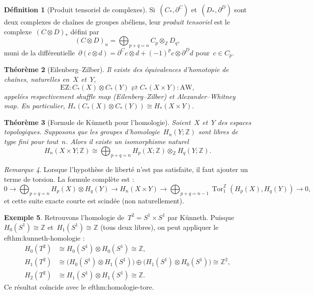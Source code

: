 \documentclass[12pt,a4paper,openany]{book}
\theoremstyle{definition}
\newtheorem{definition}{Définition}[chapter]
\newtheorem{exemple}[definition]{Exemple}
\theoremstyle{plain}
\newtheorem{theoreme}[definition]{Théorème}
\theoremstyle{remark}
\newtheorem{remarque}[definition]{Remarque}
\newcommand{\Z}{\mathbb{Z}}
\begin{document}
\begin{definition}[Produit tensoriel de complexes]\label{def:produit-tensoriel-complexes}
Si~$(C_*, \partial^C)$ et~$(D_*, \partial^D)$ sont deux complexes de chaînes de groupes
abéliens, leur \emph{produit tensoriel} est le complexe~$(C \otimes D)_*$ défini par
\[
  (C \otimes D)_n = \bigoplus_{p+q=n} C_p \otimes_\Z D_q,
\]
muni de la différentielle~$\partial(c \otimes d) = \partial^C c \otimes d + (-1)^p c \otimes \partial^D d$
pour~$c \in C_p$.
\end{definition}

\begin{theoreme}[Eilenberg--Zilber]\label{thm:eilenberg-zilber}
Il existe des équivalences d'homotopie de chaînes, naturelles en~$X$ et~$Y$,
\[
  \mathrm{EZ} \colon C_*(X) \otimes C_*(Y) \rightleftarrows C_*(X \times Y) :\! \mathrm{AW},
\]
appelées respectivement \emph{shuffle map} (Eilenberg--Zilber) et
\emph{Alexander--Whitney map}. En particulier,
$H_*(C_*(X) \otimes C_*(Y)) \cong H_*(X \times Y)$.
\end{theoreme}

\begin{theoreme}[Formule de Künneth pour l'homologie]\label{thm:kunneth-homologie}
Soient~$X$ et~$Y$ des espaces topologiques. Supposons que les groupes
d'homologie~$H_n(Y;\Z)$ sont libres de type fini pour tout~$n$. Alors il existe un
isomorphisme naturel
\[
  H_n(X \times Y;\Z) \cong
  \bigoplus_{p+q=n} H_p(X;\Z) \otimes_\Z H_q(Y;\Z).
\]
\end{theoreme}

\begin{remarque}\label{rem:kunneth-torsion}
Lorsque l'hypothèse de liberté n'est pas satisfaite, il faut ajouter un terme de
torsion. La formule complète est :
\[
  0 \to \bigoplus_{p+q=n} H_p(X) \otimes H_q(Y)
  \to H_n(X \times Y)
  \to \bigoplus_{p+q=n-1} \operatorname{Tor}_1^\Z(H_p(X), H_q(Y))
  \to 0,
\]
et cette suite exacte courte est scindée (non naturellement).
\end{remarque}

\begin{exemple}\label{ex:kunneth-tore}
Retrouvons l'homologie de~$T^2 = S^1 \times S^1$ par Künneth. Puisque~$H_0(S^1) \cong \Z$
et~$H_1(S^1) \cong \Z$ (tous deux libres), on peut appliquer le 
ef{thm:kunneth-homologie} :
\begin{align*}
  H_0(T^2) &\cong H_0(S^1) \otimes H_0(S^1) \cong \Z,\\
  H_1(T^2) &\cong \bigl(H_0(S^1) \otimes H_1(S^1)\bigr)
    \oplus \bigl(H_1(S^1) \otimes H_0(S^1)\bigr) \cong \Z^2,\\
  H_2(T^2) &\cong H_1(S^1) \otimes H_1(S^1) \cong \Z.
\end{align*}
Ce résultat coïncide avec le 
ef{thm:homologie-tore}.
\end{exemple}
\end{document}
